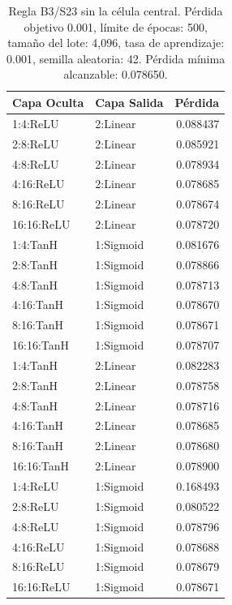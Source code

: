 \begin{table}[H]
	\centering
	\begin{tabular}{llr}
		\toprule
		\textbf{Capa Oculta} & \textbf{Capa Salida} & \textbf{Pérdida} \\ 
			\midrule
			1:4:ReLU & 2:Linear & 0.088437 \\
			2:8:ReLU & 2:Linear & 0.085921 \\
			4:8:ReLU & 2:Linear & 0.078934 \\
			4:16:ReLU & 2:Linear & 0.078685 \\
			8:16:ReLU & 2:Linear & 0.078674 \\
			16:16:ReLU & 2:Linear & 0.078720 \\
			\midrule
			1:4:TanH & 1:Sigmoid & 0.081676 \\
			2:8:TanH & 1:Sigmoid & 0.078866 \\
			4:8:TanH & 1:Sigmoid & 0.078713 \\
			4:16:TanH & 1:Sigmoid & 0.078670 \\
			8:16:TanH & 1:Sigmoid & 0.078671 \\
			16:16:TanH & 1:Sigmoid & 0.078707 \\
			\midrule
			1:4:TanH & 2:Linear & 0.082283 \\
			2:8:TanH & 2:Linear & 0.078758 \\
			4:8:TanH & 2:Linear & 0.078716 \\
			4:16:TanH & 2:Linear & 0.078685 \\
			8:16:TanH & 2:Linear & 0.078680 \\
			16:16:TanH & 2:Linear & 0.078900 \\
			\midrule
			1:4:ReLU & 1:Sigmoid & 0.168493 \\
			2:8:ReLU & 1:Sigmoid & 0.080522 \\
			4:8:ReLU & 1:Sigmoid & 0.078796 \\
			4:16:ReLU & 1:Sigmoid & 0.078688 \\
			8:16:ReLU & 1:Sigmoid & 0.078679 \\
			16:16:ReLU & 1:Sigmoid & 0.078671 \\
			\bottomrule
		\end{tabular}
		\caption{Regla B3/S23 sin la célula central. Pérdida objetivo 0.001, límite de épocas: 500, tamaño del lote: 4,096, tasa de aprendizaje: 0.001, semilla aleatoria: 42. Pérdida mínima alcanzable: 0.078650.}
		\label{tab:vecindad_centro}
	\end{table}

